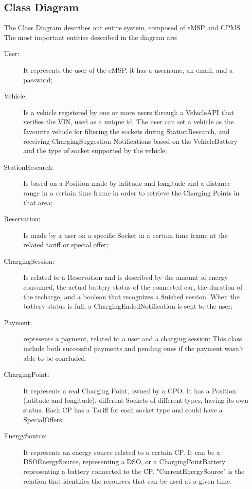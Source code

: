 \documentclass{Configuration_Files/PoliMi3i_thesis}
\begin{document}
\subsection{Class Diagram}
The Class Diagram describes our entire system, composed of eMSP and CPMS. The most important entities described in the diagram are:
\begin{description}
    \item [User:] It represents the user of the eMSP, it has a username, an email, and a password;
    
    \item[Vehicle:] Is a vehicle registered by one or more users through a VehicleAPI that verifies the VIN, used as a unique id. The user can set a vehicle as the favourite vehicle for filtering the sockets during StationResearch, and receiving ChargingSuggestion Notifications based on the VehicleBattery and the type of socket supported by the vehicle;
    
    \item [StationResearch:] Is based on a Position made by latitude and longitude and a distance range in a certain time frame in order to retrieve the Charging Points in that area;
    
    \item [Reservation:] Is made by a user on a specific Socket in a certain time frame at the related tariff or special offer;
    
    \item [ChargingSession:] Is related to a Reservation and is described by the amount of energy consumed, the actual battery status of the connected car, the duration of the recharge, and a boolean that recognizes a finished session. When the battery status is full, a ChargingEndedNotification is sent to the user;

    \item [Payment:] represents a payment, related to a user and a charging session: This class include both successful payments and pending ones if the payment wasn't able to be concluded.
    
    \item [ChargingPoint:] It represents a real Charging Point, owned by a CPO. It has a Position (latitude and longitude), different Sockets of different types, having its own status. Each CP has a Tariff for each socket type and could have a SpecialOffers;
    
    \item [EnergySource:] It represents an energy source related to a certain CP. It can be a DSOEnergySource, representing a DSO, or a ChargingPointBattery representing a battery connected to the CP. "CurrentEnergySource" is the relation that identifies the resources  that can be used at a given time. 
\end{description}
\end{document}
